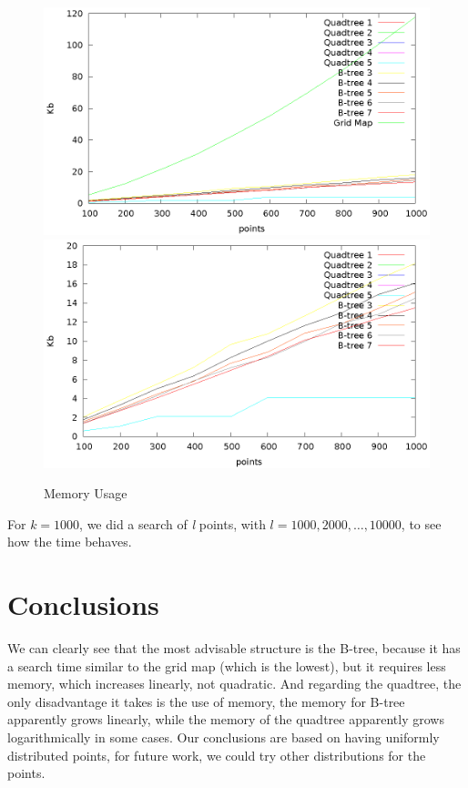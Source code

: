 \documentclass[ijoc,nonblindrev]{informs3} %
\begin{document}
\begin{figure}
  \caption{Memory Usage}
  \includegraphics[scale=1.25]{images/memory}
  \label{fig:memory}
  \includegraphics[scale=1.25]{images/memory_comparison}
\end{figure}

For $k = 1000$, we did a search of \textit{l} points, with $l = 1000,2000,\ldots,10000$, to see how the time behaves.

\section{Conclusions}
We can clearly see that the most advisable structure is the B-tree,
because it has a search time similar to the grid map (which is the lowest),
but it requires less memory, which increases linearly, not quadratic.
And regarding the quadtree, the only disadvantage it takes is the use of memory, 
the memory for B-tree apparently grows linearly, 
while the memory of the quadtree apparently grows logarithmically in some cases.
Our conclusions are based on having uniformly distributed points,
for future work, we could try other distributions for the points.
\end{document}
